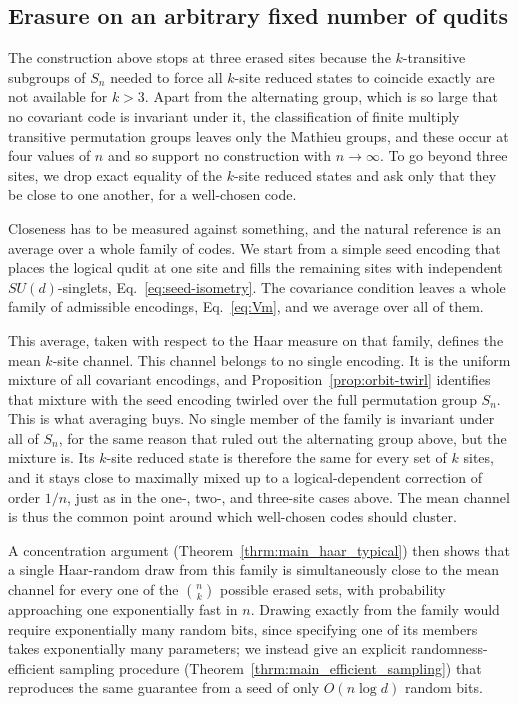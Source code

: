 \documentclass[10pt,twocolumn,superscriptaddress,aps,amsmath,amssymb,citeautoscript,floatfix,prx]{revtex4-2}
\theoremstyle{plain}
\theoremstyle{plain}
\theoremstyle{plain}
\theoremstyle{plain}
\theoremstyle{plain}
\theoremstyle{plain}
\theoremstyle{plain}
\theoremstyle{definition}
\theoremstyle{plain}
\begin{document}
\subsection{Erasure on an arbitrary fixed number of qudits}\label{subsec:summary_general_k_erasure}

The construction above stops at three erased sites because the $k$-transitive subgroups of $S_n$ needed to force all $k$-site reduced states to coincide exactly are not available for $k>3$. 
Apart from the alternating group, which is so large that no covariant code is invariant under it, the classification of finite multiply transitive permutation groups leaves only the Mathieu groups, 
and these occur at four values of $n$ and so support no construction with $n\to\infty$. To go beyond three sites, we drop exact equality of the $k$-site reduced states and ask only that they be close to one another, for a well-chosen code.

Closeness has to be measured against something, and the natural reference is an average over a whole family of codes. 
We start from a simple seed encoding that places the logical qudit at one site and fills the remaining sites with independent $SU(d)$-singlets, 
Eq.~\eqref{eq:seed-isometry}. The covariance condition leaves a whole family of admissible encodings, Eq.~\eqref{eq:Vm}, and we average over all of them.

This average, taken with respect to the Haar measure on that family, defines the mean $k$-site channel. 
This channel belongs to no single encoding. It is the uniform mixture of all covariant encodings, and Proposition~\ref{prop:orbit-twirl} identifies that mixture with the seed encoding twirled over the full permutation group $S_n$. 
This is what averaging buys. No single member of the family is invariant under all of $S_n$, for the same reason that ruled out the alternating group above, but the mixture is. 
Its $k$-site reduced state is therefore the same for every set of $k$ sites, and it stays close to maximally mixed up to a logical-dependent correction of order $1/n$, 
just as in the one-, two-, and three-site cases above. The mean channel is thus the common point around which well-chosen codes should cluster.

A concentration argument (Theorem~\ref{thrm:main_haar_typical}) then shows that a single Haar-random draw from this family is
simultaneously close to the mean channel for every one of the $\binom nk$ possible erased sets, with probability approaching one exponentially fast in $n$. 
Drawing exactly from the family would require exponentially many random bits, since specifying one of its members takes exponentially many parameters; 
we instead give an explicit randomness-efficient sampling procedure (Theorem~\ref{thrm:main_efficient_sampling}) that reproduces the same guarantee from a seed of only $O(n\log d)$ random bits.
\end{document}
